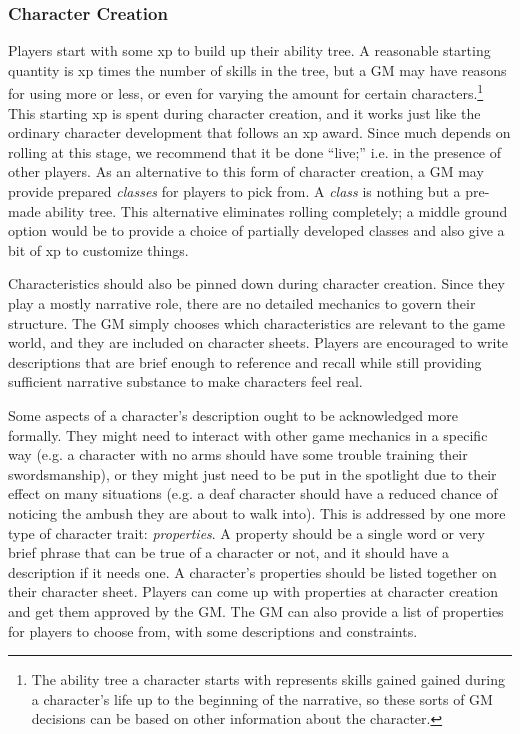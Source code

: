 \documentclass[12pt]{article}
\begin{document}
\subsubsection{Character Creation}
Players start with some xp to build up their ability tree.
A reasonable starting quantity is xp times the number of skills in the tree,
but a GM may have reasons for using more or less, or even for varying the amount for certain characters.\footnote{
The ability tree a character starts with represents skills gained
gained during a character's life up to the beginning of the narrative,
so these sorts of GM decisions can be based on other information about the character.}
This starting xp is spent during character creation, and it works just like the ordinary character development that follows an xp award.
Since much depends on rolling at this stage, we recommend that it be done ``live;'' i.e. in the presence of other players.
As an alternative to this form of character creation, a GM may provide prepared \emph{classes} for players to pick from.
A \emph{class} is nothing but a pre-made ability tree.
This alternative eliminates rolling completely; a middle ground option would be to provide a choice
of partially developed classes and also give a bit of xp to customize things.

Characteristics should also be pinned down during character creation.
Since they play a mostly narrative role, there are no detailed mechanics to govern their structure.
The GM simply chooses which characteristics are relevant to the game world, and they are included on character sheets.
Players are encouraged to write descriptions that are brief enough to reference and recall while still
providing sufficient narrative substance to make characters feel real.


Some aspects of a character's description ought to be acknowledged more formally.
They might need to interact with other game mechanics
in a specific way (e.g. a character with no arms should have some trouble training their swordsmanship),
or they might just need to be put in the spotlight due to their effect on many situations
(e.g. a deaf character should have a reduced chance of noticing the ambush they are about to walk into).
This is addressed by one more type of character trait: \emph{properties}.
A property should be a single word or very brief phrase that can be true of a character or not,
and it should have a description if it needs one.
A character's properties should be listed together on their character sheet.
Players can come up with properties at character creation and get them approved by the GM.
The GM can also provide a list of properties for players to choose from, with some descriptions and constraints.
\end{document}
